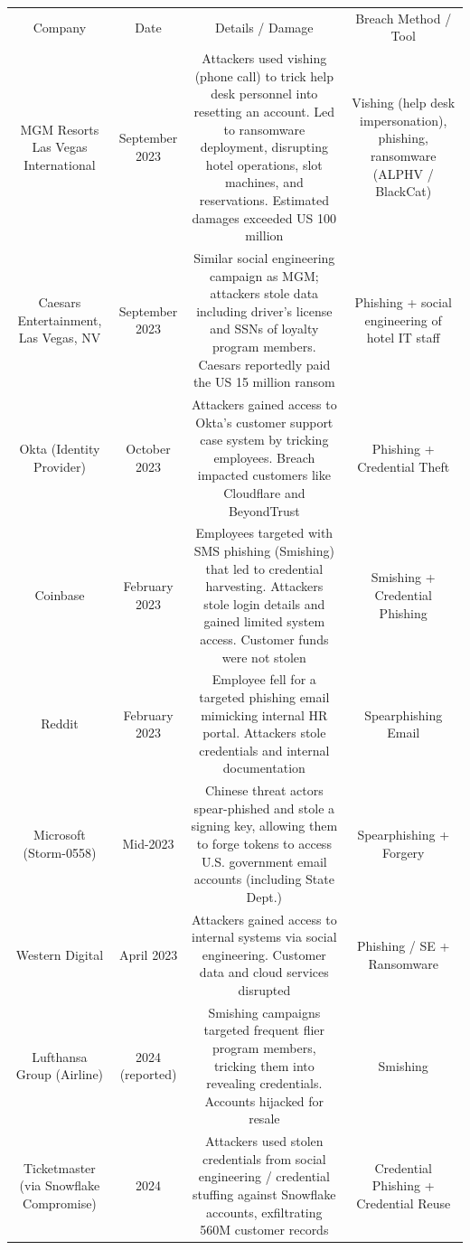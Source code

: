 \begin{table}
    \centering
    \begin{tabular}{cccc}
         Company&  Date&  Details / Damage& Breach Method / Tool\\
         MGM Resorts Las Vegas International&  September 2023&  Attackers used vishing (phone call) to trick help desk personnel into resetting an account. Led to ransomware deployment, disrupting hotel operations, slot machines, and reservations. Estimated damages exceeded US 100 million& Vishing (help desk impersonation), phishing, ransomware (ALPHV / BlackCat)\\
         Caesars Entertainment, Las Vegas, NV&  September 2023&  Similar social engineering campaign as MGM; attackers stole data including driver's license and SSNs of loyalty program members. Caesars reportedly paid the US 15 million ransom& Phishing + social engineering of hotel IT staff\\
         Okta (Identity Provider)&  October 2023&  Attackers gained access to Okta's customer support case system by tricking employees. Breach impacted customers like Cloudflare and BeyondTrust& Phishing + Credential Theft\\
       Coinbase& February 2023& Employees targeted with SMS phishing (Smishing) that led to credential harvesting. Attackers stole login details and gained limited system access. Customer funds were not stolen& Smishing + Credential Phishing\\
       Reddit& February 2023& Employee fell for a targeted phishing email mimicking internal HR portal. Attackers stole credentials and internal documentation& Spearphishing Email \\
       Microsoft (Storm-0558)& Mid-2023& Chinese threat actors spear-phished and stole a signing key, allowing them to forge tokens to access U.S. government email accounts (including State Dept.)& Spearphishing + Forgery\\
       Western Digital& April 2023& Attackers gained access to internal systems via social engineering. Customer data and cloud services disrupted& Phishing / SE + Ransomware\\
       Lufthansa Group (Airline)& 2024 (reported)& Smishing campaigns targeted frequent flier program members, tricking them into revealing credentials. Accounts hijacked for resale& Smishing\\
       Ticketmaster (via Snowflake Compromise)& 2024& Attackers used stolen credentials from social engineering / credential stuffing against Snowflake accounts, exfiltrating 560M customer records& Credential Phishing + Credential Reuse\\

\end{tabular}
\end{table}
